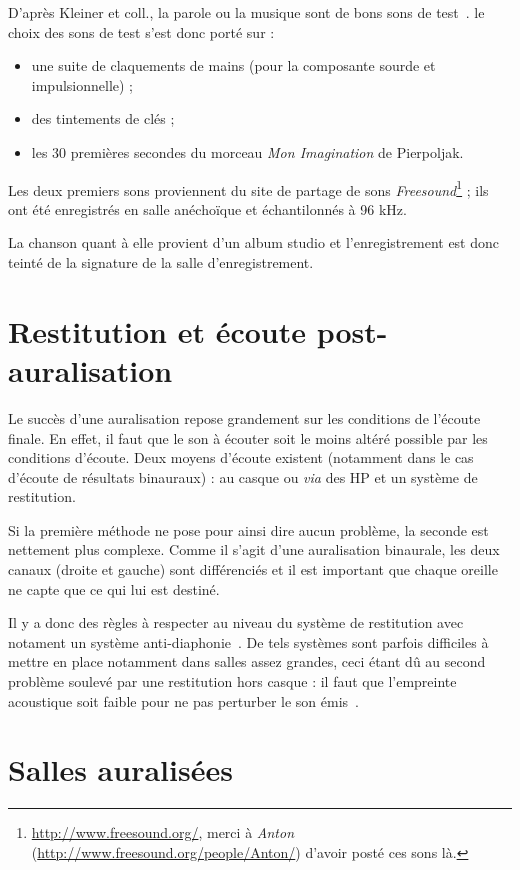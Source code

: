 D'après Kleiner et coll., la parole ou la musique sont de bons sons de test~\cite{Kle93}. le choix des sons de test
s'est donc porté sur :

\begin{itemize}
    \item une suite de claquements de mains (pour la composante sourde et impulsionnelle) ;
    \item des tintements de clés ;
    \item les 30 premières secondes du morceau \textit{Mon Imagination} de Pierpoljak.
\end{itemize}

Les deux premiers sons proviennent du site de partage de sons
\textit{Freesound}\footnote{\url{http://www.freesound.org/}, merci à \textit{Anton}
(\url{http://www.freesound.org/people/Anton/}) d'avoir posté ces sons là.} ; ils ont été enregistrés en salle anéchoïque
et échantilonnés à 96 kHz.

La chanson quant à elle provient d'un album studio et l'enregistrement est donc teinté de la signature de la salle
d'enregistrement.

\section{Restitution et écoute post-auralisation} %

Le succès d'une auralisation repose grandement sur les conditions de l'écoute finale. En effet, il faut que le son à
écouter soit le moins altéré possible par les conditions d'écoute. Deux moyens d'écoute existent (notamment dans le cas
d'écoute de résultats binauraux) : au casque ou \textit{via} des HP et un système de restitution. 

Si la première méthode ne pose pour ainsi dire aucun problème, la seconde est nettement plus complexe.
Comme il s'agit d'une auralisation binaurale, les deux canaux (droite et gauche) sont différenciés et il est important
que chaque oreille ne capte que ce qui lui est destiné.

Il y a donc des règles à respecter au niveau du système de restitution avec notament un système
anti-diaphonie~\cite{Kle93}. De tels systèmes sont parfois difficiles à mettre en place notamment dans salles assez
grandes, ceci étant dû au second problème soulevé par une restitution hors casque : il faut que l'empreinte acoustique
soit faible pour ne pas perturber le son émis~\cite{Bru10}.

\section{Salles auralisées} %

